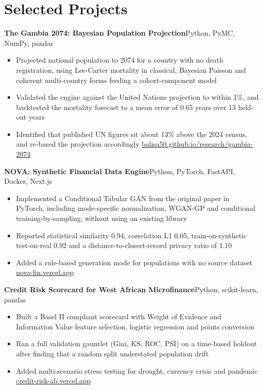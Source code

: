 \documentclass[a4paper,10pt]{article}
\newcommand{\project}[2]{%
  \noindent\textbf{#1}\hfill{\small #2}\\[0.15em]
}
\begin{document}
\section{Selected Projects}

\project{The Gambia 2074: Bayesian Population Projection}{Python, PyMC, NumPy, pandas}
\begin{itemize}
  \item Projected national population to 2074 for a country with no death
    registration, using Lee-Carter mortality in classical, Bayesian Poisson and
    coherent multi-country forms feeding a cohort-component model
  \item Validated the engine against the United Nations projection to within
    1\%, and backtested the mortality forecast to a mean error of 0.65 years
    over 13 held-out years
  \item Identified that published UN figures sit about 13\% above the 2024
    census, and re-based the projection accordingly
    \hfill{\small \href{https://balisa50.github.io/research/gambia-2074}{balisa50.github.io/research/gambia-2074}}
\end{itemize}

\vspace{0.3em}
\project{NOVA: Synthetic Financial Data Engine}{Python, PyTorch, FastAPI, Docker, Next.js}
\begin{itemize}
  \item Implemented a Conditional Tabular GAN from the original paper in
    PyTorch, including mode-specific normalization, WGAN-GP and conditional
    training-by-sampling, without using an existing library
  \item Reported statistical similarity 0.94, correlation L1 0.05,
    train-on-synthetic test-on-real 0.92 and a distance-to-closest-record
    privacy ratio of 1.10
  \item Added a rule-based generation mode for populations with no source
    dataset \hfill{\small \href{https://nova-fin.vercel.app}{nova-fin.vercel.app}}
\end{itemize}

\vspace{0.3em}
\project{Credit Risk Scorecard for West African Microfinance}{Python, scikit-learn, pandas}
\begin{itemize}
  \item Built a Basel II compliant scorecard with Weight of Evidence and
    Information Value feature selection, logistic regression and points
    conversion
  \item Ran a full validation gauntlet (Gini, KS, ROC, PSI) on a time-based
    holdout after finding that a random split understated population drift
  \item Added multi-scenario stress testing for drought, currency crisis and
    pandemic \hfill{\small \href{https://credit-risk-ab.vercel.app}{credit-risk-ab.vercel.app}}
\end{itemize}
\end{document}
